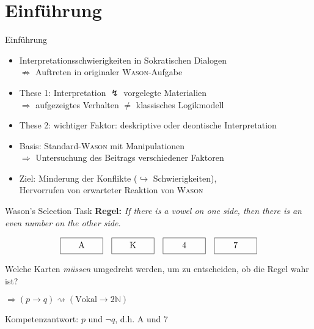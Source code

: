 
{
    \section{Einführung}
}

\begin{frame}{Einführung {\scriptsize \cite[S.~93-95]{stenningHumanReasoningCognitive2008}}}
    \begin{itemize}
        \item Interpretationsschwierigkeiten in Sokratischen Dialogen \\
            $\not \Rightarrow$ Auftreten in originaler \textsc{Wason}-Aufgabe

        \item These 1: Interpretation $\lightning$ vorgelegte Materialien \\
            $\Rightarrow$ aufgezeigtes Verhalten $\ne$ klassisches Logikmodell

        \item These 2: wichtiger Faktor: deskriptive oder deontische Interpretation

        \item Basis: Standard-\textsc{Wason} mit \alert{Manipulationen} \\
            $\Rightarrow$ Untersuchung des Beitrags verschiedener Faktoren
        
        \item Ziel: Minderung der Konflikte ($\hookrightarrow$ Schwierigkeiten), \\
            Hervorrufen von erwarteter Reaktion von \textsc{Wason}
    \end{itemize}
\end{frame}


\begin{frame}{Wason's Selection Task {\scriptsize \cite[S.~44-46]{stenningHumanReasoningCognitive2008}}}
    \textbf{Regel:} \emph{If there is a vowel on one side, then there is an even number on the other side.}

    \[
        \framebox[5em][c]{A\strut}\quad
        \framebox[5em][c]{K\strut}\quad
        \framebox[5em][c]{4\strut}\quad
        \framebox[5em][c]{7\strut}
    \]

    Welche Karten \emph{müssen} umgedreht werden, um zu entscheiden, ob die Regel wahr ist?

    $\Rightarrow (p \to q) \rightsquigarrow (\text{Vokal} \to 2\mathbb{N})$

    Kompetenzantwort: $p$ und $\lnot q$, d.h. A und 7
\end{frame}

